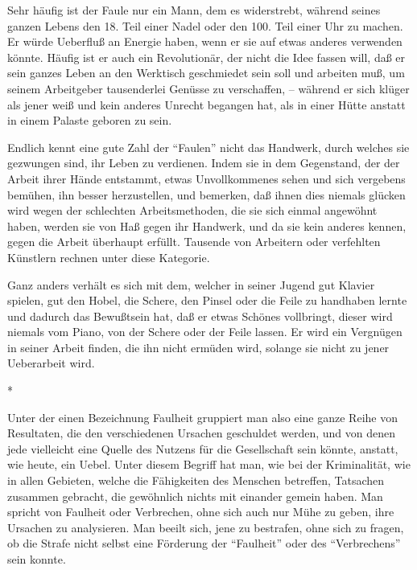 \documentclass{scrbook}
\begin{document}
Sehr häufig ist der Faule nur ein Mann, dem es widerstrebt, während seines ganzen Lebens den 18. Teil einer Nadel oder den 100. Teil einer Uhr zu machen. Er würde Ueberfluß an Energie haben, wenn er sie auf etwas anderes verwenden könnte. Häufig ist er auch ein Revolutionär, der nicht die Idee fassen will, daß er sein ganzes Leben an den Werktisch geschmiedet sein soll und arbeiten muß, um seinem Arbeitgeber tausenderlei Genüsse zu verschaffen, – während er sich klüger als jener weiß und kein anderes Unrecht begangen hat, als in einer Hütte anstatt in einem Palaste geboren zu sein.

Endlich kennt eine gute Zahl der ``Faulen'' nicht das Handwerk, durch welches sie gezwungen sind, ihr Leben zu verdienen. Indem sie in dem Gegenstand, der der Arbeit ihrer Hände entstammt, etwas Unvollkommenes sehen und sich vergebens bemühen, ihn besser herzustellen, und bemerken, daß ihnen dies niemals glücken wird wegen der schlechten Arbeitsmethoden, die sie sich einmal angewöhnt haben, werden sie von Haß gegen ihr Handwerk, und da sie kein anderes kennen, gegen die Arbeit überhaupt erfüllt. Tausende von Arbeitern oder verfehlten Künstlern rechnen unter diese Kategorie.

Ganz anders verhält es sich mit dem, welcher in seiner Jugend gut Klavier spielen, gut den Hobel, die Schere, den Pinsel oder die Feile zu handhaben lernte und dadurch das Bewußtsein hat, daß er etwas Schönes vollbringt, dieser wird niemals vom Piano, von der Schere oder der Feile lassen. Er wird ein Vergnügen in seiner Arbeit finden, die ihn nicht ermüden wird, solange sie nicht zu jener Ueberarbeit wird.

\begin{center}*\end{center}

Unter der einen Bezeichnung Faulheit gruppiert man also eine ganze Reihe von Resultaten, die den verschiedenen Ursachen geschuldet werden, und von denen jede vielleicht eine Quelle des Nutzens für die Gesellschaft sein könnte, anstatt, wie heute, ein Uebel. Unter diesem Begriff hat man, wie bei der Kriminalität, wie in allen Gebieten, welche die Fähigkeiten des Menschen betreffen, Tatsachen zusammen gebracht, die gewöhnlich nichts mit einander gemein haben. Man spricht von Faulheit oder Verbrechen, ohne sich auch nur Mühe zu geben, ihre Ursachen zu analysieren. Man beeilt sich, jene zu bestrafen, ohne sich zu fragen, ob die Strafe nicht selbst eine Förderung der ``Faulheit'' oder des ``Verbrechens'' sein konnte.
\end{document}
